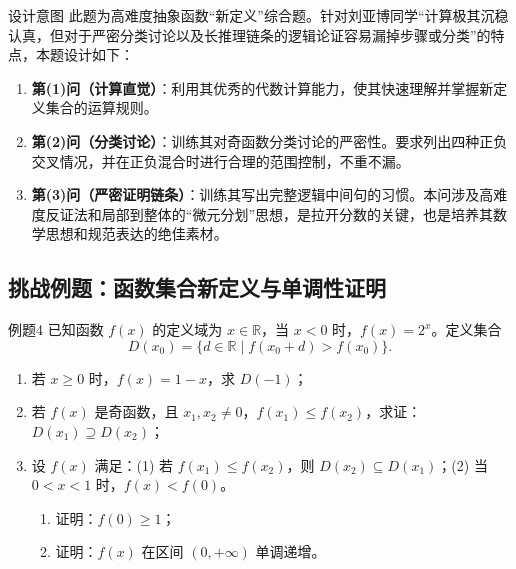 \documentclass[11pt,a4paper]{ctexart}
\begin{document}
\begin{teachbox}{设计意图}
此题为高难度抽象函数“新定义”综合题。针对刘亚博同学“计算极其沉稳认真，但对于严密分类讨论以及长推理链条的逻辑论证容易漏掉步骤或分类”的特点，本题设计如下：
\begin{enumerate}
  \item \textbf{第(1)问（计算直觉）}：利用其优秀的代数计算能力，使其快速理解并掌握新定义集合的运算规则。
  \item \textbf{第(2)问（分类讨论）}：训练其对奇函数分类讨论的严密性。要求列出四种正负交叉情况，并在正负混合时进行合理的范围控制，不重不漏。
  \item \textbf{第(3)问（严密证明链条）}：训练其写出完整逻辑中间句的习惯。本问涉及高难度反证法和局部到整体的“微元分划”思想，是拉开分数的关键，也是培养其数学思想和规范表达的绝佳素材。
\end{enumerate}
\end{teachbox}

\subsection{挑战例题：函数集合新定义与单调性证明}

\begin{exbox}{例题4}
已知函数 $f(x)$ 的定义域为 $x \in \mathbb{R}$，当 $x < 0$ 时，$f(x) = 2^x$。定义集合
\[
D(x_0) = \{d \in \mathbb{R} \mid f(x_0 + d) > f(x_0)\}.
\]
\begin{enumerate}[label=(\arabic*)]
  \item 若 $x \ge 0$ 时，$f(x) = 1 - x$，求 $D(-1)$；
  \item 若 $f(x)$ 是奇函数，且 $x_1, x_2 \neq 0$，$f(x_1) \le f(x_2)$，求证：$D(x_1) \supseteq D(x_2)$；
  \item 设 $f(x)$ 满足：(1) 若 $f(x_1) \le f(x_2)$，则 $D(x_2) \subseteq D(x_1)$；(2) 当 $0 < x < 1$ 时，$f(x) < f(0)$。
  \begin{enumerate}[label=(\roman*)]
    \item 证明：$f(0) \ge 1$；
    \item 证明：$f(x)$ 在区间 $(0, +\infty)$ 单调递增。
  \end{enumerate}
\end{enumerate}
\end{exbox}
\end{document}
